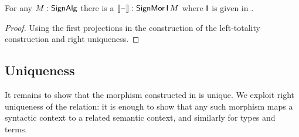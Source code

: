 \begin{lemma}\label{lem:rec}
  For any $M:\mathsf{SignAlg}$ there is a $\llbracket\mathord{\hspace{1pt}\text{--}\hspace{1pt}}\rrbracket : \mathsf{SignMor}\,\mathsf{I}\,M$
  where $\mathsf{I}$ is given in .
\end{lemma}
\begin{proof}
  Using the first projections in the construction of the left-totality
  construction and right uniqueness.
\end{proof}

\subsection{Uniqueness}

It remains to show that the morphism constructed in  is
unique. We exploit right uniqueness of the relation: it is enough to
show that any such morphism maps a syntactic context to a related
semantic context, and similarly for types and terms.


